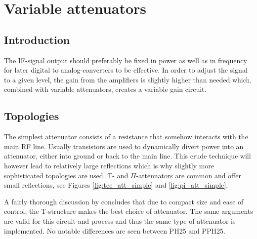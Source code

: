 \chapter{Variable attenuators}\label{ch:vargain}
	\section{Introduction}

		The IF-signal output should preferably be fixed in power as well as in frequency for later digital to analog-converters to be effective. In order to adjust the signal to a given level, the gain from the amplifiers is slightly higher than needed which, combined with variable attenuators, creates a variable gain circuit.

	


	\section{Topologies}
		
		The simplest attenuator consists of a resistance that somehow interacts with the main RF line. Usually transistors are used to dynamically divert power into an attenuator, either into ground or back to the main line. This crude technique will however lead to relatively large reflections which is why slightly more sophisticated topologies are used. T- and $\Pi$-attenuators are common and offer small reflections, see Figures \ref{fig:tee_att_simple} and \ref{fig:pi_att_simple}.


		
		A fairly thorough discussion by \citeauthor{gustavsson07} concludes that due to compact size and ease of control, the T-structure makes the best choice of attenuator.\autocite{gustavsson07} The same arguments are valid for this circuit and process and thus the same type of attenuator is implemented. No notable differences are seen between PH25 and PPH25.

